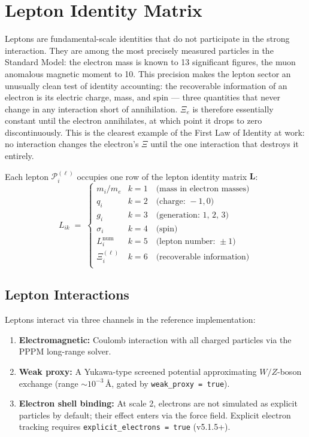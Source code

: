 \documentclass[11pt,a4paper]{article}
\newcommand{\Pid}{\mathscr{P}}
\newcommand{\Rec}{\Xi}
\newcommand{\ang}{\,\text{\AA}}
\begin{document}
\section{Lepton Identity Matrix}\label{sec:lepton}

Leptons are fundamental-scale identities that do not participate in the strong
interaction.  They are among the most precisely measured particles in the
Standard Model: the electron mass is known to 13 significant figures, the
muon anomalous magnetic moment to 10.  This precision makes the lepton sector
an unusually clean test of identity accounting: the recoverable information of
an electron is its electric charge, mass, and spin --- three quantities that
never change in any interaction short of annihilation.  $\Rec_e$ is therefore
essentially constant until the electron annihilates, at which point it drops
to zero discontinuously.  This is the clearest example of the First Law of
Identity at work: no interaction changes the electron's $\Rec$ until the one
interaction that destroys it entirely.

Each lepton $\Pid_i^{(\ell)}$ occupies one row of the lepton identity matrix
$\mathbf{L}$:
\[
  L_{ik} \;=\;
  \begin{cases}
    m_i / m_e     & k=1 \quad\text{(mass in electron masses)} \\
    q_i           & k=2 \quad\text{(charge: } -1, 0\text{)} \\
    g_i           & k=3 \quad\text{(generation: 1, 2, 3)} \\
    \sigma_i       & k=4 \quad\text{(spin)} \\
    L_i^{\mathrm{num}} & k=5 \quad\text{(lepton number: } \pm 1\text{)} \\
    \Rec_i^{(\ell)} & k=6 \quad\text{(recoverable information)} \\
  \end{cases}
\]

\subsection{Lepton Interactions}

Leptons interact via three channels in the reference implementation:
\begin{enumerate}[leftmargin=1.5em]
  \item \textbf{Electromagnetic:} Coulomb interaction with all charged
    particles via the PPPM long-range solver.
  \item \textbf{Weak proxy:} A Yukawa-type screened potential approximating
    $W/Z$-boson exchange (range $\sim 10^{-3}\ang$, gated by
    \texttt{weak\_proxy = true}).
  \item \textbf{Electron shell binding:} At scale 2, electrons are not
    simulated as explicit particles by default; their effect enters via the
    force field.  Explicit electron tracking requires
    \texttt{explicit\_electrons = true} (v5.1.5+).
\end{enumerate}
\end{document}
